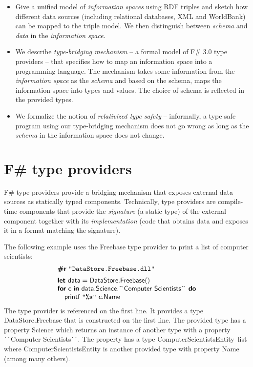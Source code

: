 \documentclass[10pt]{sigplanconf}
\newcommand{\kvd}[1]{\textbf{\sffamily #1}}
\newcommand{\ident}[1]{\textnormal{\sffamily #1}}
\newcommand{\fqt}{\`{}\hspace{-0.25em}\`{}}
\begin{document}
\begin{itemize}
\item Give a unified model of \emph{information spaces} using RDF triples and sketch how different 
  data sources (including relational databases, XML and WorldBank) can be mapped to the triple model. 
  We then distinguish between \emph{schema} and \emph{data} in the \emph{information space}.

\item We describe \emph{type-bridging mechanism} -- a formal model of F\# 3.0 type providers --
  that specifies how to map an information space into a programming language. The mechanism takes
  some information from the \emph{information space} as the \emph{schema} and based on the schema,
  maps the information space into types and values. The choice of schema is reflected in the 
  provided types.

\item We formalize the notion of \emph{relativized type safety} -- informally, a type safe program 
  using our type-bridging mechanism does not go wrong as long as the \emph{schema} in the 
  information space does not change. 

\end{itemize}

\newpage

\section{F\# type providers}
F\# type providers \cite{providers-techreport} provide a bridging mechanism that exposes external
data sources as statically typed components. Technically, type providers are compile-time components
that provide the \emph{signature} (a static type) of the external component together with its 
\emph{implementation} (code that obtains data and exposes it in a format matching the signature).

The following example uses the Freebase \cite{providers-freebase} type provider to print a list of
computer scientists:
%
\begin{equation*}
\begin{array}{l}
\kvd{\#r}~\texttt{"DataStore.Freebase.dll"}\\[0.5em]
\kvd{let}~\ident{data}=\ident{DataStore.Freebase}()\\
\kvd{for}~\ident{c}~\kvd{in}~\ident{data.Science.\fqt Computer Scientists\fqt}~\kvd{do}\\
\quad\ident{printf}~\texttt{"\%s"}~\ident{c.Name}
\end{array}
\end{equation*}
%
The type provider is referenced on the first line. It provides a type \ident{DataStore.Freebase} that
is constructed on the first line. The provided type has a property \ident{Science} which returns an
instance of another type with a property \ident{\fqt Computer Scientists\fqt}. The property has a type
\ident{ComputerScientistsEntity~list} where \ident{ComputerScientistsEntity} is another provided type
with property \ident{Name} (among many others).
\end{document}
